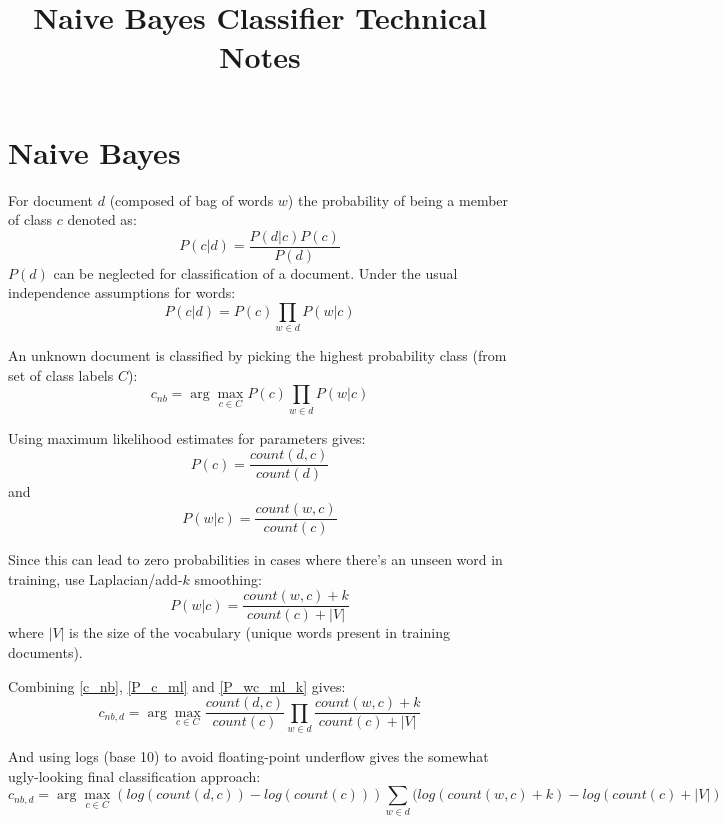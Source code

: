 \documentclass{article}
\title{Naive Bayes Classifier Technical Notes}
\begin{document}
\section{Naive Bayes}
For document $d$ (composed of bag of words $w$) the probability of being a member of class $c$ denoted as:
\begin{equation}\label{P_cd1}
P(c|d) = \frac{ P(d|c) P(c) }{P(d)}
\end{equation}
$P(d)$ can be neglected for classification of a document.  Under the usual independence assumptions for words:
\begin{equation}\label{P_cd2}
P(c|d) = P(c) \prod_{w \in d}P(w|c)
\end{equation}

An unknown document is classified by picking the highest probability class (from set of class labels $C$):
\begin{equation}\label{c_nb}
c_{nb} = \arg\max_{c \in C} P(c) \prod_{w \in d} P(w|c)
\end{equation}


Using maximum likelihood estimates for parameters gives:
\begin{equation}\label{P_c_ml}
P(c) = \frac{count(d,c)}{count(d)}
\end{equation}
and
\begin{equation}\label{P_wc_ml}
P(w|c) = \frac{ count(w,c) }{count(c)}
\end{equation}

Since this can lead to zero probabilities in cases where there's an unseen word in training, use Laplacian/add-$k$ smoothing:
\begin{equation}\label{P_wc_ml_k}
P(w|c) = \frac{ count(w,c)+k}{count(c)+|V|}
\end{equation}
where $|V|$ is the size of the vocabulary (unique words present in training documents).

Combining \ref{c_nb}, \ref{P_c_ml} and \ref{P_wc_ml_k} gives:
\begin{equation}
c_{nb,d} = \arg\max_{c \in C} \frac{count(d,c)}{count(c)} \prod_{w \in d}\frac{count(w,c)+k}{count(c) + |V|}
\end{equation}

And using logs (base 10) to avoid floating-point underflow gives the somewhat ugly-looking final classification approach:
\begin{equation}
c_{nb,d} = \arg\max_{c \in C} (log(count(d,c)) - log(count(c)))  \sum_{w \in d} ( log(count(w,c)+k) - log(count(c) + |V|)
\end{equation}
\end{document}
